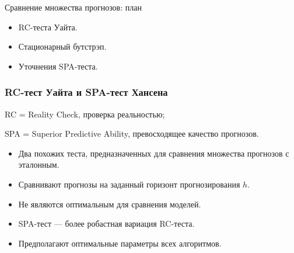 
\begin{frame} %


\end{frame}



\begin{frame}{Сравнение множества прогнозов: план}
  \begin{itemize}[<+->]
    \item RC-теста Уайта.
    \item Стационарный \alert{бутстрэп}.
    \item \alert{Уточнения} SPA-теста.
  \end{itemize}

\end{frame}


\begin{frame}
    \frametitle{RC-тест Уайта и SPA-тест Хансена}

    RC = Reality Check, проверка реальностью;

    SPA = Superior Predictive Ability, превосходящее качество прогнозов.
    \pause 

    \begin{itemize}
        \item Два похожих теста, предназначенных для сравнения \alert{множества} прогнозов с эталонным. \pause
        \item Сравнивают прогнозы на \alert{заданный горизонт} прогнозирования $h$. \pause
        \item Не являются оптимальным для \alert{сравнения моделей}. \pause
        \item SPA-тест — более \alert{робастная} вариация RC-теста. \pause
        \item Предполагают \alert{оптимальные} параметры всех алгоритмов.
    \end{itemize}

\end{frame}

